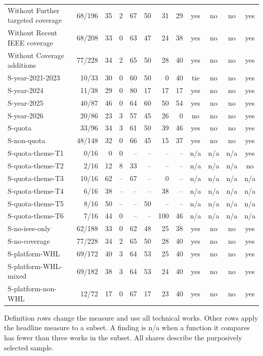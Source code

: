 \begin{table}[!t]
\begin{tabularx}{\linewidth}{@{}Yrrrrrrrcccc@{}}
Without Further targeted coverage & 68/196 & 35 & 2 & 67 & 50 & 31 & 29 & yes & no & no & yes \\
Without Recent IEEE coverage & 68/208 & 33 & 0 & 63 & 47 & 24 & 38 & yes & no & no & yes \\
Without Coverage additions & 77/228 & 34 & 2 & 65 & 50 & 28 & 40 & yes & no & no & yes \\
S-year-2021-2023 & 10/33 & 30 & 0 & 60 & 50 & 0 & 40 & tie & no & no & yes \\
S-year-2024 & 11/38 & 29 & 0 & 80 & 17 & 17 & 17 & yes & no & no & yes \\
S-year-2025 & 40/87 & 46 & 0 & 64 & 60 & 50 & 54 & yes & no & no & yes \\
S-year-2026 & 20/86 & 23 & 3 & 57 & 45 & 26 & 0 & no & no & no & yes \\
S-quota & 33/96 & 34 & 3 & 61 & 50 & 39 & 46 & yes & no & no & yes \\
S-non-quota & 48/148 & 32 & 0 & 66 & 45 & 15 & 37 & yes & no & no & yes \\
S-quota-theme-T1 & 0/16 & 0 & 0 & -- & -- & -- & -- & n/a & n/a & n/a & yes \\
S-quota-theme-T2 & 2/16 & 12 & 8 & 33 & -- & -- & -- & n/a & n/a & n/a & no \\
S-quota-theme-T3 & 10/16 & 62 & -- & 67 & -- & 0 & -- & n/a & n/a & n/a & n/a \\
S-quota-theme-T4 & 6/16 & 38 & -- & -- & -- & 38 & -- & n/a & n/a & n/a & n/a \\
S-quota-theme-T5 & 8/16 & 50 & -- & -- & 50 & -- & -- & n/a & n/a & n/a & n/a \\
S-quota-theme-T6 & 7/16 & 44 & 0 & -- & -- & 100 & 46 & n/a & n/a & n/a & n/a \\
S-no-ieee-only & 62/188 & 33 & 0 & 62 & 48 & 25 & 38 & yes & no & no & yes \\
S-no-coverage & 77/228 & 34 & 2 & 65 & 50 & 28 & 40 & yes & no & no & yes \\
S-platform-WHL & 69/172 & 40 & 3 & 64 & 53 & 25 & 40 & yes & no & no & yes \\
S-platform-WHL-mixed & 69/182 & 38 & 3 & 64 & 53 & 24 & 40 & yes & no & no & yes \\
S-platform-non-WHL & 12/72 & 17 & 0 & 67 & 17 & 23 & 40 & yes & no & no & yes \\
\bottomrule
\end{tabularx}
\par\vspace{3pt}\parbox{\linewidth}{\footnotesize\raggedright Definition rows change the measure and use all technical works. Other rows apply the headline measure to a subset. A finding is n/a when a function it compares has fewer than three works in the subset. All shares describe the purposively selected sample.}
\end{table}
